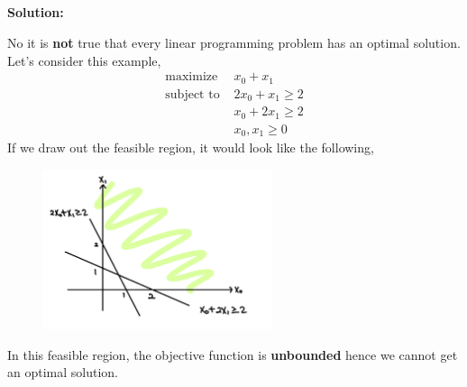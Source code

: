 \documentclass[11pt]{article}
\newenvironment{solution}
  {\par\noindent\textbf{Solution:}\par}
  {\par}
\begin{document}
\subsection{}
\begin{solution}
  No it is \textbf{not} true that every linear programming problem has an optimal solution. Let's consider this example,
  \[
    \begin{aligned}
      \text{maximize } &x_0 + x_1 \\ 
      \text{subject to } &2x_0 + x_1 \ge 2 \\ 
                        &x_0 +2x_1 \ge 2 \\ 
                        &x_0,x_1 \ge 0
    \end{aligned}
  \]
  If we draw out the feasible region, it would look like the following, 
  \begin{figure}[H]
\centering
\includegraphics[width=0.6\textwidth]{figure1.png} 

\end{figure}
In this feasible region, the objective function is \textbf{unbounded} hence we cannot get an optimal solution.

\end{solution}
\end{document}
